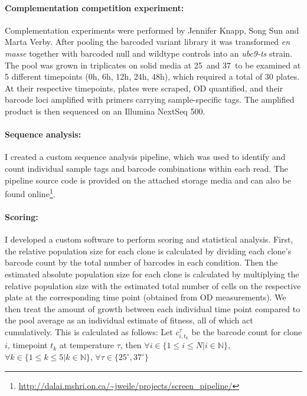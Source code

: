 \paragraph{Complementation competition experiment:} Complementation experiments were performed by Jennifer Knapp, Song Sun and Marta Verby. After pooling the barcoded  variant library it was transformed \textit{en masse} together with barcoded null and wildtype controls into an  \textit{ubc9-ts} strain. 
The pool was grown in triplicates on solid media at 25\celsius\ and 37\celsius\ to be examined at 5 different timepoints (0h, 6h, 12h, 24h, 48h), which required a total of 30 plates. At their respective timepoints, plates were scraped, OD quantified, and their barcode loci amplified with primers carrying sample-specific tags. The amplified product is then sequenced on an Illumina NextSeq 500.

\paragraph{Sequence analysis:} I created a custom sequence analysis pipeline, which was used to identify and count individual sample tags and barcode combinations within each read. The pipeline source code is provided on the attached storage media and can also be found online\footnote{\url{http://dalai.mshri.on.ca/~jweile/projects/screen_pipeline/}}.

\paragraph{Scoring:} I developed a custom software to perform scoring and statistical analysis. First, the relative population size for each clone is calculated by dividing each clone's barcode count by the total number of barcodes in each condition. Then the estimated absolute population size for each clone is calculated by multiplying the relative population size with the estimated total number of cells on the respective plate at the corresponding time point (obtained from OD measurements). We then treat the amount of growth between each individual time point compared to the pool average as an individual estimate of fitness, all of which act cumulatively. This is calculated as follows: Let $c_{i,t_k}^\tau$ be the barcode count for clone $i$, timepoint $t_k$ at temperature $\tau$, then $ \forall i \in \{1 \le i \le N | i \in \mathbb{N} \}$, 
$\forall k \in \{1 \le k \le 5 | k \in \mathbb{N} \}$, 
$\forall \tau \in \{25^{\circ},37^{\circ} \}$

